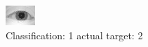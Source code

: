 \begin{figure}[h!]
\begin{center}
\includegraphics[width=0.60\columnwidth]{figures/ID876_class_1_target_2.png}
\end{center}
\caption{ Classification: 1 actual target: 2}
\label{fig:ID876_class_1_target_2}
\end{figure}
